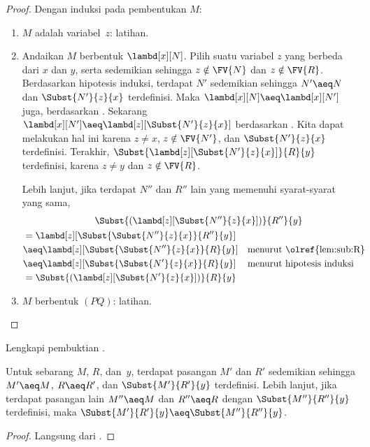\documentclass[../../../include/open-logic-section]{subfiles}
\begin{document}
\begin{proof}
  Dengan induksi pada pembentukan $M$:
  \begin{enumerate}
  \item $M$ adalah variabel~$z$: latihan.
  \item Andaikan $M$ berbentuk $\lambd[x][N]$. Pilih suatu variabel $z$ yang
    berbeda dari $x$ dan $y$, serta sedemikian sehingga $z \notin \FV{N}$
    dan $z \notin \FV{R}$. Berdasarkan hipotesis induksi, terdapat $N'$
    sedemikian sehingga $N' \aeq N$ dan $\Subst{N'}{z}{x}$ terdefinisi. Maka
    $\lambd[x][N] \aeq \lambd[x][N']$ juga, berdasarkan
    . Sekarang
    $\lambd[x][N'] \aeq \lambd[z][\Subst{N'}{z}{x}]$ berdasarkan
    . Kita dapat melakukan hal ini
    karena $z \ne x$, $z \notin \FV{N'}$, dan $\Subst{N'}{z}{x}$
    terdefinisi. Terakhir,
    $\Subst{\lambd[z][\Subst{N'}{z}{x}]}{R}{y}$ terdefinisi, karena
    $z \neq y$ dan $z \notin \FV{R}$.

    Lebih lanjut, jika terdapat $N''$ dan $R''$ lain yang memenuhi
    syarat-syarat yang sama,
    \begin{multline*}
      \Subst{(\lambd[z][\Subst{N''}{z}{x}])}{R''}{y} \\
    \begin{aligned}
      &= \lambd[z][\Subst{\Subst{N''}{z}{x}}{R''}{y}] \\
      &\aeq \lambd[z][\Subst{\Subst{N''}{z}{x}}{R}{y}] && \text{menurut
        \olref{lem:sub:R}}\\
      &\aeq \lambd[z][\Subst{\Subst{N'}{z}{x}}{R}{y}]
      && \text{menurut hipotesis induksi}\\
      &=\Subst{(\lambd[z][\Subst{N'}{z}{x}])}{R}{y}
    \end{aligned}
    \end{multline*}
    \item $M$ berbentuk $(PQ)$: latihan.
  \end{enumerate}
\end{proof}

\begin{prob}
  Lengkapi pembuktian .
\end{prob}

\begin{cor}
  Untuk sebarang $M$, $R$, dan~$y$, terdapat pasangan $M'$ dan $R'$
  sedemikian sehingga $M' \aeq M$, $R \aeq R'$, dan $\Subst{M'}{R'}{y}$
  terdefinisi. Lebih lanjut, jika terdapat pasangan lain $M'' \aeq M$ dan
  $R'' \aeq R$ dengan $\Subst{M''}{R''}{y}$ terdefinisi, maka
  $\Subst{M'}{R'}{y} \aeq \Subst{M''}{R''}{y}$.
\end{cor}

\begin{proof}
  Langsung dari .
\end{proof}
\end{document}
